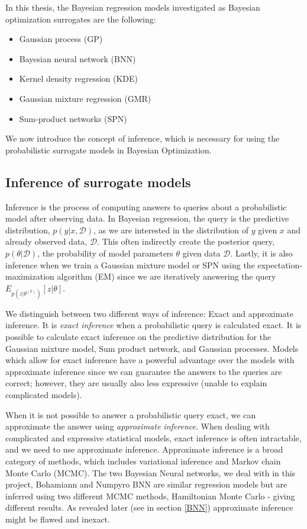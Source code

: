 In this thesis, the Bayesian regression models investigated as Bayesian optimization surrogates are
the following:
\begin{itemize}[noitemsep]
    \item Gaussian process (GP)
    \item Bayesian neural network (BNN)
    \item Kernel density regression (KDE)
    \item Gaussian mixture regression (GMR)
    \item Sum-product networks (SPN)
\end{itemize}

We now introduce the concept of inference, which is necessary for using the probabilistic surrogate models
in Bayesian Optimization. 

\subsection{Inference of surrogate models}
Inference is the process of computing answers to queries about a probabilistic model after observing
data. In Bayesian regression, the query is the predictive distribution, $p(y|x,\mathcal{D})$, as we
are interested in the distribution of $y$ given $x$ and already observed data, $\mathcal{D}$. This
often indirectly create the posterior query, $p(\theta|\mathcal{D})$, the probability of model
parameters $\theta$ given data $\mathcal{D}$. Lastly, it is also inference when we train a Gaussian
mixture model or SPN using the expectation-maximization algorithm (EM) since we are iteratively
answering the query $E_{p(z|\theta^{(k)})}[z|\theta]$.

We distinguish between two different ways of inference: Exact and approximate inference. It is
\textit{exact inference} when a probabilistic query is calculated exact. It is possible to
calculate exact inference on the predictive distribution for the Gaussian mixture model, Sum product
network, and Gaussian processes. Models which allow for exact inference have a powerful advantage
over the models with approximate inference since we can guarantee the answers to the queries are
correct; however, they are usually also less expressive (unable to explain complicated models). 

When it is not possible to answer a probabilistic query exact, we can approximate the answer using
\textit{approximate inference}. When dealing with complicated and expressive statistical models,
exact inference is often intractable, and we need to use approximate inference. Approximate
inference is a broad category of methods, which includes variational inference and Markov chain
Monte Carlo (MCMC). The two Bayesian Neural networks, we deal with in this project, Bohamiann and
Numpyro BNN are similar regression models but are inferred using two different MCMC methods,
Hamiltonian Monte Carlo - giving different results. As revealed later (see in section \ref{BNN})
approximate inference might be flawed and inexact. 

